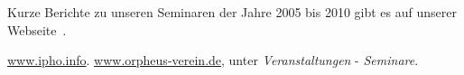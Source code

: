 \documentclass[DIV13,11pt,a4paper,headinclude]{scrartcl}
\begin{document}
Kurze Berichte zu unseren Seminaren der Jahre 2005 bis 2010 gibt es auf unserer
Webseite~\cite{orpheusweb}.


\renewcommand*{\refname}{Referenzen} %
\begin{thebibliography}{5}

 \url{www.ipho.info}.
 \url{www.orpheus-verein.de}, unter \emph{Veranstaltungen} - \emph{Seminare}.

\end{thebibliography}
\end{document}

